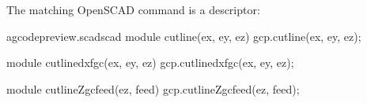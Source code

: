 \documentclass{ltxdoc}
\begin{document}
%   
%
%

The matching OpenSCAD command is a descriptor:

\lstset{firstnumber=\thegcpscad}
\begin{writecode}{a}{gcodepreview.scad}{scad}
module cutline(ex, ey, ez){
    gcp.cutline(ex, ey, ez);
}

module cutlinedxfgc(ex, ey, ez){
    gcp.cutlinedxfgc(ex, ey, ez);
}

module cutlineZgcfeed(ez, feed){
    gcp.cutlineZgcfeed(ez, feed);
}

\end{writecode}
\addtocounter{gcpscad}{12}      
\end{document}

